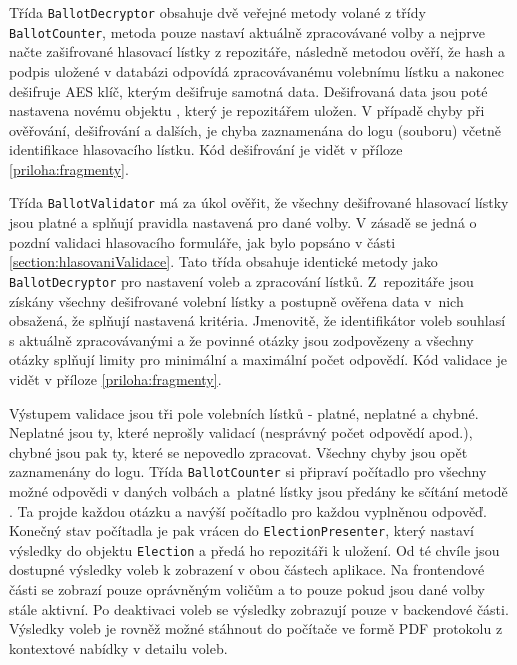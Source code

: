 Třída \texttt{BallotDecryptor} obsahuje dvě veřejné metody volané z třídy \texttt{BallotCounter}, metoda  pouze nastaví aktuálně zpracovávané volby a  nejprve načte zašifrované hlasovací lístky z repozitáře, následně metodou %
 ověří, že hash a podpis uložené v databázi odpovídá zpracovávanému volebnímu lístku a nakonec dešifruje AES klíč, kterým dešifruje samotná data. Dešifrovaná data jsou poté nastavena novému objektu , který je repozitářem uložen. V případě chyby při ověřování, dešifrování a dalších, je chyba zaznamenána do logu (souboru) včetně identifikace hlasovacího lístku. Kód dešifrování je vidět v příloze \ref{priloha:fragmenty}.
  
Třída \texttt{BallotValidator} má za úkol ověřit, že všechny dešifrované hlasovací lístky jsou platné a splňují pravidla nastavená pro dané volby. V zásadě se jedná o pozdní validaci hlasovacího formuláře, jak bylo popsáno v části \ref{section:hlasovaniValidace}. Tato třída obsahuje identické metody jako \texttt{BallotDecryptor} pro nastavení voleb a zpracování lístků. Z~repozitáře jsou získány všechny dešifrované volební lístky a postupně ověřena data v~nich obsažená, že splňují nastavená kritéria. Jmenovitě, že identifikátor voleb souhlasí s aktuálně zpracovávanými a že povinné otázky jsou zodpovězeny a všechny otázky splňují limity pro minimální a maximální počet odpovědí. Kód validace je vidět v příloze \ref{priloha:fragmenty}.

Výstupem validace jsou tři pole volebních lístků - platné, neplatné a chybné. Neplatné jsou ty, které neprošly validací (nesprávný počet odpovědí apod.), chybné jsou pak ty, které se nepovedlo zpracovat. Všechny chyby jsou opět zaznamenány do logu. Třída \texttt{BallotCounter} si připraví počítadlo pro všechny možné odpovědi v daných volbách a~platné lístky jsou předány ke sčítání metodě %
. Ta projde každou otázku a navýší počítadlo pro každou vyplněnou odpověď. Konečný stav počítadla je pak vrácen do \texttt{ElectionPresenter}, který nastaví výsledky do objektu \texttt{Election} a předá ho repozitáři k uložení. Od té chvíle jsou dostupné výsledky voleb k zobrazení v obou částech aplikace. Na frontendové části se zobrazí pouze oprávněným voličům a to pouze pokud jsou dané volby stále aktivní. Po deaktivaci voleb se výsledky zobrazují pouze v backendové části. Výsledky voleb je rovněž možné stáhnout do počítače ve formě PDF protokolu z kontextové nabídky v detailu voleb.

